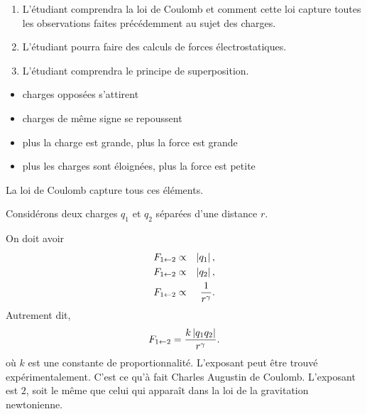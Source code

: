 
\begin{enumerate}
  \item L'étudiant comprendra la loi de Coulomb et comment cette loi capture
    toutes les observations faites précédemment au sujet des charges.
  \item L'étudiant pourra faire des calculs de forces électrostatiques.
  \item L'étudiant comprendra le principe de superposition.
\end{enumerate}


\begin{itemize}
  \item charges opposées s'attirent
  \item charges de même signe se repoussent
  \item plus la charge est grande, plus la force est grande
  \item plus les charges sont éloignées, plus la force est petite
\end{itemize}

La loi de Coulomb capture tous ces éléments.

Considérons deux charges $q_1$ et $q_2$ séparées d'une distance $r$.
\begin{center}
\end{center}
On doit avoir
\begin{eqnarray*}
  F_{1 \leftarrow 2} & \propto & \left| q_1 \right|, \\
  F_{1 \leftarrow 2} & \propto & \left| q_2 \right|, \\
  F_{1 \leftarrow 2} & \propto & \frac{1}{r^\gamma}.
\end{eqnarray*}
Autrement dit,
$$
  F_{1 \leftarrow 2} = \frac{k\left| q_1 q_2 \right|}{r^\gamma}.
$$
où $k$ est une constante de proportionnalité. L'exposant peut être trouvé
expérimentalement. C'est ce qu'à fait Charles Augustin de Coulomb. L'exposant
est $2$, soit le même que celui qui apparaît dans la loi de la gravitation
newtonienne.

